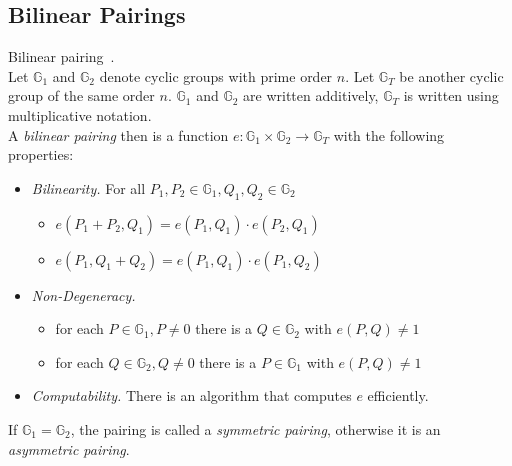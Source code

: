 
\subsection{Bilinear Pairings}\label{sec:bilinear-pairings}

\begin{definition}Bilinear pairing~\cite{kiraz_still_2016}.\\
    Let $\mathbb{G}_1$ and $\mathbb{G}_2$ denote cyclic groups with prime order $n$.
Let $\mathbb{G}_T$ be another cyclic group of the same order $n$. 
$\mathbb{G}_1$ and $\mathbb{G}_2$ are written additively, $\mathbb{G}_T$ is written using multiplicative notation.\\
    A \emph{bilinear pairing} then is a function $e: \mathbb{G}_1 \times \mathbb{G}_2 \rightarrow \mathbb{G}_T$ with the following properties:
    \begin{itemize}
        \item \emph{Bilinearity.} For all $P_1, P_2 \in \mathbb{G}_1, Q_1, Q_2 \in \mathbb{G}_2$
        \begin{itemize}
            \item $e(P_1+P_2, Q_1) = e(P_1,Q_1)\cdot e(P_2,Q_1)$
            \item $e(P_1, Q_1+Q_2)=e(P_1,Q_1)\cdot e(P_1,Q_2)$
        \end{itemize}
        \item \emph{Non-Degeneracy.}
        \begin{itemize}
            \item for each $P \in \mathbb{G}_1, P \neq 0$ there is a $Q \in \mathbb{G}_2$ with $e(P, Q) \neq 1$
            \item for each $Q \in \mathbb{G}_2, Q \neq 0$ there is a $P \in \mathbb{G}_1$ with $e(P, Q) \neq 1$
        \end{itemize}
        \item \emph{Computability.} There is an algorithm that computes $e$ efficiently.
    \end{itemize}
    If $\mathbb{G}_1 = \mathbb{G}_2$, the pairing is called a \emph{symmetric pairing}, otherwise it is an \emph{asymmetric pairing}.
\end{definition}

